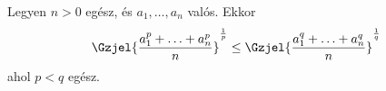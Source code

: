 Legyen $n>0$ egész, és $a_{1},\hdots,a_{n}$ valós. Ekkor 
$$
\Gzjel{\frac{a_{1}^{p}+\hdots+a_{n}^{p}}{n}}^{\frac{1}{p}} \le  
\Gzjel{\frac{a_{1}^{q}+\hdots+a_{n}^{q}}{n}}^{\frac{1}{q}} 
$$
ahol $p<q$ egész.
